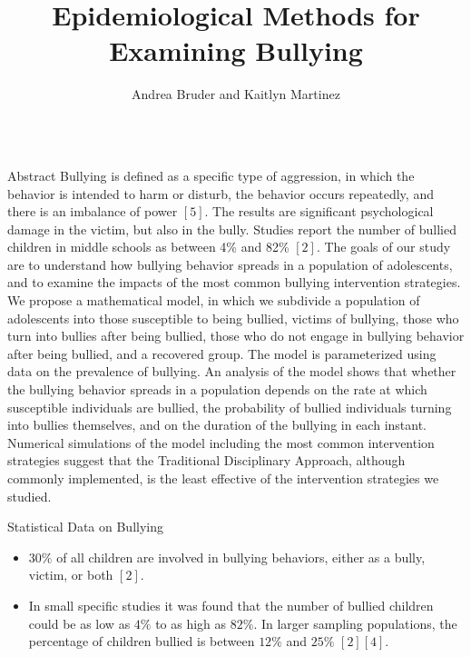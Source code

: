 \documentclass[serif,mathserif,final]{beamer}
\title{Epidemiological Methods for Examining Bullying}
\author{Andrea Bruder and Kaitlyn Martinez}
\institute{Department of Mathematics and Computer Science, Colorado College, Colorado Springs, CO}
\begin{document}
\begin{frame}{}
  \begin{columns}[t]

    \begin{column}{0.23\linewidth}

      \begin{block}{Abstract} \small
Bullying is defined as a specific type of aggression, in which the behavior is intended to harm or disturb, the behavior occurs repeatedly, and there is an imbalance of power $[5]$. The results are significant psychological damage in the victim, but also in the bully. Studies report the number of bullied children in middle schools as between 4\% and 82\% $[2]$. The goals of our study are to understand how bullying behavior spreads in a population of adolescents, and to examine the impacts of the most common bullying intervention strategies. We propose a mathematical model, in which we subdivide a population of adolescents into those susceptible to being bullied, victims of bullying, those who turn into bullies after being bullied, those who do not engage in bullying behavior after being bullied, and a recovered group. The model is parameterized using data on the prevalence of bullying. An analysis of the model shows that whether the bullying behavior spreads in a population depends on the rate at which susceptible individuals are bullied, the probability of bullied individuals turning into bullies themselves, and on the duration of the bullying in each instant. Numerical simulations of the model including the most common intervention strategies suggest that the Traditional Disciplinary Approach, although commonly implemented, is the least effective of the intervention strategies we studied. 
\end{block}

      \begin{block}{Statistical Data on Bullying}
       \begin{itemize}
\small\item $30\%$ of all children are involved in bullying behaviors, either as a bully, victim, or both $[2]$. 

\item In small specific studies it was found that the number of bullied children could be as low as $4\%$ to as high as $82\%$. In larger sampling populations, the percentage of children bullied is between $12\%$ and $25\%$ $[2][4]$. 


\end{itemize}
\end{block}
\end{column}
\end{columns}
\end{frame}
\end{document}
